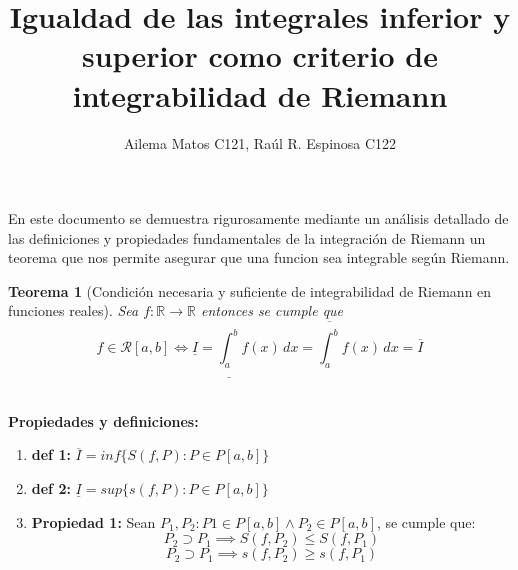 \documentclass{article}
\title{Igualdad de las integrales inferior y superior como criterio de integrabilidad de Riemann}
\author{
Ailema Matos C121,
Raúl R. Espinosa C122 
}
\newtheorem{theorem}{Teorema}
\begin{document}
\maketitle

\section*{}

En este documento se demuestra rigurosamente mediante un análisis detallado de las definiciones y propiedades fundamentales de la integración de Riemann 
un teorema que nos permite asegurar que una funcion sea integrable según Riemann.\\

\begin{theorem}[Condición necesaria y suficiente de integrabilidad de Riemann en funciones reales]
Sea \( f: \mathbb{R} \to \mathbb{R} \) entonces se cumple que \[f \in \mathcal{R}[a, b] \Longleftrightarrow \underline{I} = \underline{\int_a^b} f(x) \, dx = \overline{\int_a^b} f(x) \, dx = \overline{I}\]\\
\end{theorem}

\textbf{Propiedades y definiciones:}

\begin{enumerate}
    \item \textbf{def 1:}  \(\overline{I} = inf \{ S(f, P): P \in P[a, b] \} \)  
    \item \textbf{def 2:}  \(\underline{I} = sup\{ s(f, P): P \in P[a, b] \} \)
    \item \textbf{Propiedad 1:} Sean \(P_1, P_2:  P1 \in P[a, b] \wedge P_2 \in P[a,b] \), se cumple que:
    \[
    P_2 \supset P_1  \implies S(f, P_2) \leq S(f, P_1)
    \]
    \[
   P_2 \supset P_1 \implies s(f, P_2) \geq s(f, P_1)
    \]
\end{enumerate} 
\end{document}
